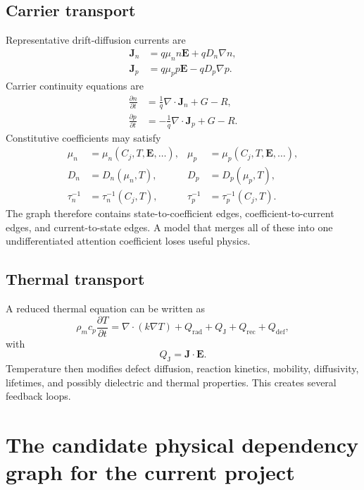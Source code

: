 \documentclass[11pt]{article}
\newcommand{\Evec}{\bm{E}}
\newcommand{\Jvec}{\bm{J}}
\begin{document}
\subsection{Carrier transport}

Representative drift-diffusion currents are
\begin{align}
\Jvec_n&=q\mu_n n\Evec+qD_n\nabla n,\\
\Jvec_p&=q\mu_p p\Evec-qD_p\nabla p.
\label{eq:carrier_currents}
\end{align}
Carrier continuity equations are
\begin{align}
\frac{\partial n}{\partial t}&=\frac{1}{q}\nabla\cdot\Jvec_n+G-R,\\
\frac{\partial p}{\partial t}&=-\frac{1}{q}\nabla\cdot\Jvec_p+G-R.
\label{eq:carrier_continuity}
\end{align}
Constitutive coefficients may satisfy
\begin{align}
\mu_n&=\mu_n(C_j,T,\Evec,\ldots), & \mu_p&=\mu_p(C_j,T,\Evec,\ldots),\\
D_n&=D_n(\mu_n,T), & D_p&=D_p(\mu_p,T),\\
\tau_n^{-1}&=\tau_n^{-1}(C_j,T), & \tau_p^{-1}&=\tau_p^{-1}(C_j,T).
\end{align}
The graph therefore contains state-to-coefficient edges, coefficient-to-current edges, and current-to-state edges. A model that merges all of these into one undifferentiated attention coefficient loses useful physics.

\subsection{Thermal transport}

A reduced thermal equation can be written as
\begin{equation}
\rho_m c_p\frac{\partial T}{\partial t}
=\nabla\cdot(k\nabla T)
+Q_{\mathrm{rad}}+Q_{\mathrm{J}}+Q_{\mathrm{rec}}+Q_{\mathrm{def}},
\label{eq:thermal}
\end{equation}
with
\begin{equation}
Q_{\mathrm{J}}=\Jvec\cdot\Evec.
\label{eq:joule_heat}
\end{equation}
Temperature then modifies defect diffusion, reaction kinetics, mobility, diffusivity, lifetimes, and possibly dielectric and thermal properties. This creates several feedback loops.

\section{The candidate physical dependency graph for the current project}
\end{document}
